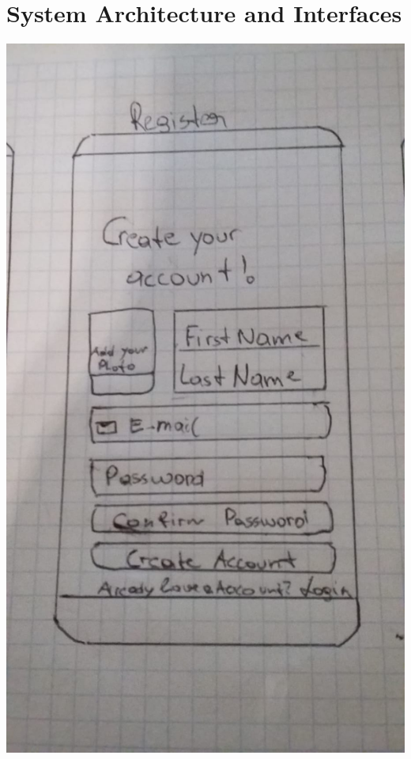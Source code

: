 \documentclass[12pt]{article}
\theoremstyle{definition}
\begin{document}
\pagebreak



\section{System Architecture and Interfaces}
\includegraphics[scale=.2]{register.jpeg}
\end{document}
